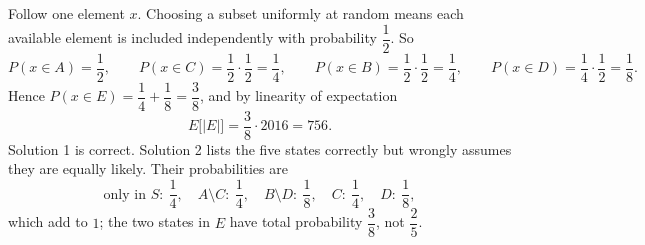 Follow one element $x$. Choosing a subset uniformly at random means each available element is included independently with probability $\dfrac{1}{2}$. So
\[
P(x\in A)=\dfrac{1}{2},\qquad P(x\in C)=\dfrac{1}{2}\cdot\dfrac{1}{2}=\dfrac{1}{4},\qquad P(x\in B)=\dfrac{1}{2}\cdot\dfrac{1}{2}=\dfrac{1}{4},\qquad P(x\in D)=\dfrac{1}{4}\cdot\dfrac{1}{2}=\dfrac{1}{8} .
\]
Hence $P(x\in E)=\dfrac{1}{4}+\dfrac{1}{8}=\dfrac{3}{8}$, and by linearity of expectation
\[
E\bigl[|E|\bigr]=\dfrac{3}{8}\cdot2016=\boxed{756}.
\]
Solution 1 is correct. Solution 2 lists the five states correctly but wrongly assumes they are equally likely. Their probabilities are
\[
\text{only in }S:\ \dfrac{1}{4},\quad A\setminus C:\ \dfrac{1}{4},\quad B\setminus D:\ \dfrac{1}{8},\quad C:\ \dfrac{1}{4},\quad D:\ \dfrac{1}{8},
\]
which add to $1$; the two states in $E$ have total probability $\dfrac{3}{8}$, not $\dfrac{2}{5}$.
